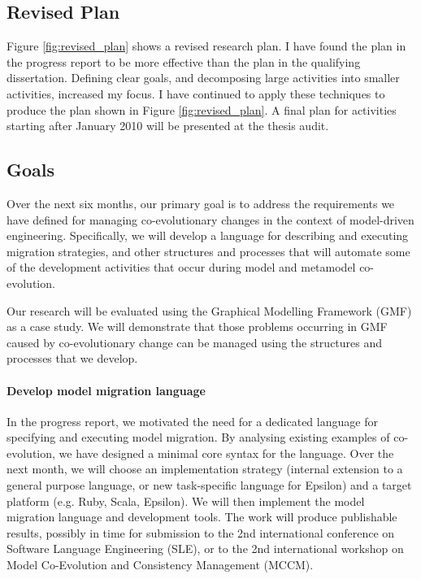 
\subsection{Revised Plan}
\label{subsec:plan}
Figure \ref{fig:revised_plan} shows a revised research plan. I have found the plan in the progress report to be more effective than the plan in the qualifying dissertation. Defining clear goals, and decomposing large activities into smaller activities, increased my focus. I have continued to apply these techniques to produce the plan shown in Figure \ref{fig:revised_plan}. A final plan for activities starting after January 2010 will be presented at the thesis audit.

\clearpage
\setlength\paperheight{297mm}
\setlength\paperwidth{420mm}
\setlength\pdfpageheight{\paperheight}
\setlength\pdfpagewidth{\paperwidth}



\setlength\paperheight{297mm}
\setlength\paperwidth{210mm}
\setlength\pdfpageheight{\paperheight}
\setlength\pdfpagewidth{\paperwidth}

\subsection{Goals} %
\label{sub:goals}
Over the next six months, our primary goal is to address the requirements we have defined for managing co-evolutionary changes in the context of model-driven engineering. Specifically, we will develop a language for describing and executing migration strategies, and other structures and processes that will automate some of the development activities that occur during model and metamodel co-evolution.

Our research will be evaluated using the Graphical Modelling Framework (GMF) \cite{gronback06gmf} as a case study. We will demonstrate that those problems occurring in GMF caused by co-evolutionary change can be managed using the structures and processes that we develop.

\paragraph{Develop model migration language}
In the progress report, we motivated the need for a dedicated language for specifying and executing model migration. By analysing existing examples of co-evolution, we have designed a minimal core syntax for the language. Over the next month, we will choose an implementation strategy (internal extension to a general purpose language, or new task-specific language for Epsilon) and a target platform (e.g. Ruby, Scala, Epsilon). We will then implement the model migration language and development tools. The work will produce publishable results, possibly in time for submission to the 2nd international conference on Software Language Engineering (SLE), or to the 2nd international workshop on Model Co-Evolution and Consistency Management (MCCM).

